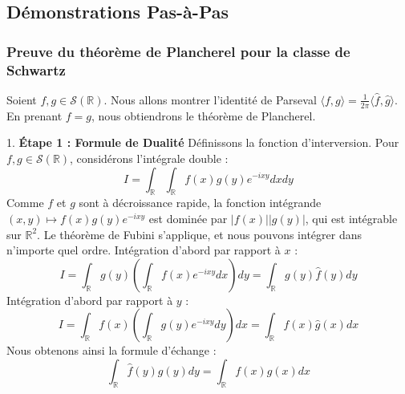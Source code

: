 \documentclass[11pt,a4paper]{article}
\begin{document}
\begin{center}
\end{center}

\subsection*{Démonstrations Pas-à-Pas}

\subsubsection*{Preuve du théorème de Plancherel pour la classe de Schwartz}

Soient $f, g \in \mathcal{S}(\mathbb{R})$. Nous allons montrer l'identité de Parseval $\langle f, g \rangle = \frac{1}{2\pi} \langle \hat{f}, \hat{g} \rangle$. En prenant $f=g$, nous obtiendrons le théorème de Plancherel.

1. \textbf{Étape 1 : Formule de Dualité}
Définissons la fonction d'interversion. Pour $f, g \in \mathcal{S}(\mathbb{R})$, considérons l'intégrale double :
$$ I = \int_{\mathbb{R}} \int_{\mathbb{R}} f(x) g(y) e^{-ixy} dx dy $$
Comme $f$ et $g$ sont à décroissance rapide, la fonction intégrande $(x,y) \mapsto f(x)g(y)e^{-ixy}$ est dominée par $|f(x)||g(y)|$, qui est intégrable sur $\mathbb{R}^2$.
Le théorème de Fubini s'applique, et nous pouvons intégrer dans n'importe quel ordre.
Intégration d'abord par rapport à $x$ :
$$ I = \int_{\mathbb{R}} g(y) \left( \int_{\mathbb{R}} f(x) e^{-ixy} dx \right) dy = \int_{\mathbb{R}} g(y) \hat{f}(y) dy $$
Intégration d'abord par rapport à $y$ :
$$ I = \int_{\mathbb{R}} f(x) \left( \int_{\mathbb{R}} g(y) e^{-ixy} dy \right) dx = \int_{\mathbb{R}} f(x) \hat{g}(x) dx $$
Nous obtenons ainsi la formule d'échange :
$$ \int_{\mathbb{R}} \hat{f}(y) g(y) dy = \int_{\mathbb{R}} f(x) \hat{g}(x) dx $$
\end{document}
